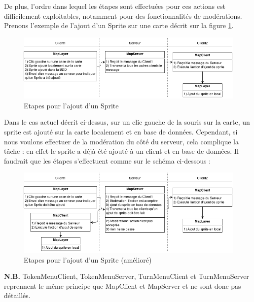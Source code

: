 De plus, l'ordre dans lequel les étapes sont effectuées pour ces actions est difficilement exploitables, notamment pour des fonctionnalités de modérations. Prenons l'exemple de l'ajout d'un Sprite sur une carte décrit sur la figure \ref{fig:network_addsprite}.
\newpage

\begin{figure}[h!]
	\centering
	\includegraphics[width=1.0\textwidth]{img/network_addsprite.png}
	\caption{Etapes pour l'ajout d'un Sprite}
	\label{fig:network_addsprite}
\end{figure}

Dans le cas actuel décrit ci-dessus, sur un clic gauche de la souris sur la carte, un sprite est ajouté sur la carte localement et en base de données. Cependant, si nous voulons effectuer de la modération du côté du serveur, cela complique la tâche : en effet le sprite a déjà été ajouté à un client et en base de données. Il faudrait que les étapes s'effectuent comme sur le schéma ci-dessous :

\begin{figure}[h!]
	\centering
	\includegraphics[width=1.0\textwidth]{img/network_addsprite_better.png}
	\caption{Etapes pour l'ajout d'un Sprite (amélioré)}
\end{figure}

\textbf{N.B.} TokenMenuClient, TokenMenuServer, TurnMenuClient et TurnMenuServer reprennent le même principe que MapClient et MapServer et ne sont donc pas détaillés.

